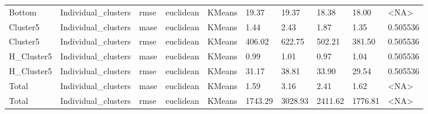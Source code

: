 \begin{tabular}{llllllllll}
     Bottom & Individual\_clusters &   rmse &  euclidean &        KMeans &   19.37 &    19.37 &                 18.38 &         18.00 &      <NA> \\
   Cluster5 & Individual\_clusters &   mase &  euclidean &        KMeans &    1.44 &     2.43 &                  1.87 &          1.35 &  0.505536 \\
   Cluster5 & Individual\_clusters &   rmse &  euclidean &        KMeans &  406.02 &   622.75 &                502.21 &        381.50 &  0.505536 \\
 H\_Cluster5 & Individual\_clusters &   mase &  euclidean &        KMeans &    0.99 &     1.01 &                  0.97 &          1.04 &  0.505536 \\
 H\_Cluster5 & Individual\_clusters &   rmse &  euclidean &        KMeans &   31.17 &    38.81 &                 33.90 &         29.54 &  0.505536 \\
      Total & Individual\_clusters &   mase &  euclidean &        KMeans &    1.59 &     3.16 &                  2.41 &          1.62 &      <NA> \\
      Total & Individual\_clusters &   rmse &  euclidean &        KMeans & 1743.29 &  3028.93 &               2411.62 &       1776.81 &      <NA> \\
\bottomrule
\end{tabular}
